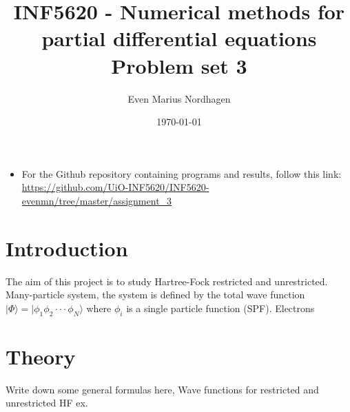 \documentclass[norsk,a4paper,12pt]{article}
\title{INF5620 - Numerical methods for partial differential equations\\\vspace{2mm} \Large{Problem set 3}}
\author{\large Even Marius Nordhagen}
\date\today
\begin{document}
\maketitle

\begin{itemize}
\item For the Github repository containing programs and results, follow this link: 
\url{https://github.com/UiO-INF5620/INF5620-evenmn/tree/master/assignment_3}
\end{itemize}

\section{Introduction}
The aim of this project is to study Hartree-Fock restricted and unrestricted. Many-particle system, the system is defined by the total wave function $|\Phi\rangle=|\phi_1\phi_2\cdot\cdot\cdot\phi_N\rangle$ where $\phi_i$ is a single particle function (SPF). Electrons

\section{Theory}
Write down some general formulas here, Wave functions for restricted and unrestricted HF ex. 
\end{document}
